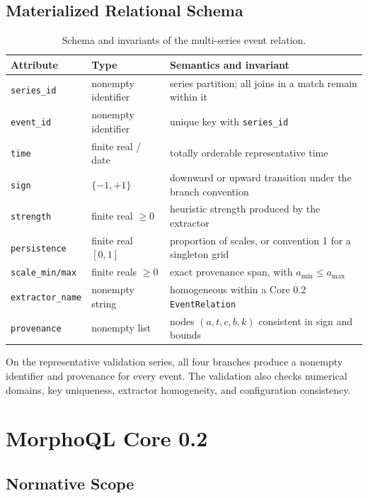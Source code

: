 \documentclass[11pt,a4paper]{article}
\newcommand{\code}[1]{\texttt{#1}}
\begin{document}
\subsection{Materialized Relational Schema}

\begin{table}[H]
\centering
\caption{Schema and invariants of the multi-series event relation.}
\label{tab:event-schema}
\small
\begin{tabularx}{\textwidth}{@{}p{3.0cm}p{2.2cm}X@{}}
\toprule
Attribute & Type & Semantics and invariant \\
\midrule
\code{series\_id} & nonempty identifier & series partition; all joins in a match remain within it \\
\code{event\_id} & nonempty identifier & unique key with \code{series\_id} \\
\code{time} & finite real / date & totally orderable representative time \\
\code{sign} & $\{-1,+1\}$ & downward or upward transition under the branch convention \\
\code{strength} & finite real $\geq0$ & heuristic strength produced by the extractor \\
\code{persistence} & finite real $[0,1]$ & proportion of scales, or convention 1 for a singleton grid \\
\code{scale\_min/max} & finite reals $\geq0$ & exact provenance span, with $a_{\min}\leq a_{\max}$ \\
\code{extractor\_name} & nonempty string & homogeneous within a Core 0.2 \code{EventRelation} \\
\code{provenance} & nonempty list & nodes $(a,t,c,b,k)$ consistent in sign and bounds \\
\bottomrule
\end{tabularx}
\end{table}

On the representative validation series, all four branches produce a nonempty identifier and provenance for every event. The validation also checks numerical domains, key uniqueness, extractor homogeneity, and configuration consistency.

\section{MorphoQL Core 0.2}

\subsection{Normative Scope}
\end{document}

